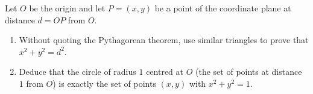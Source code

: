 Let $O$ be the origin and let $P=(x,y)$ be a point of the coordinate plane at distance $d=OP$ from $O$.
\begin{enumerate}
\item[(a)] Without quoting the Pythagorean theorem, use similar triangles to prove that $x^2+y^2=d^2$.
\item[(b)] Deduce that the circle of radius $1$ centred at $O$ (the set of points at distance $1$ from $O$) is exactly the set of points $(x,y)$ with $x^2+y^2=1$.
\end{enumerate}
